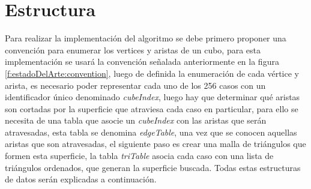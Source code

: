 \section{Estructura}
\label{ch:implementacion:sec:estructura}

Para realizar la implementación del algoritmo se debe primero proponer una convención para enumerar los vertices y aristas de un cubo, para esta implementación se usará la convención señalada anteriormente en la figura \ref{f:estadoDelArte:convention}, luego de definida la enumeración de cada vértice y arista, es necesario poder representar cada uno de los 256 casos con un identificador único denominado \emph{cubeIndex}, luego hay que determinar qué aristas son cortadas por la superficie que atraviesa cada caso en particular, para ello se necesita de una tabla que asocie un \emph{cubeIndex} con las aristas que serán atravesadas, esta tabla se denomina \emph{edgeTable}, una vez que se conocen aquellas aristas que son atravesadas, el siguiente paso es crear una malla de triángulos que formen esta superficie, la tabla \emph{triTable} asocia cada caso con una lista de triángulos ordenados, que generan la superficie buscada. Todas estas estructuras de datos serán explicadas a continuación.